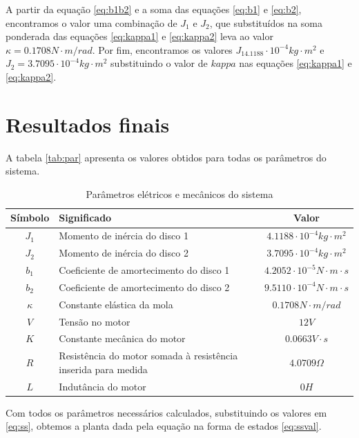 \documentclass{article}
\begin{document}
A partir da equação \ref{eq:b1b2} e a soma das equações \ref{eq:b1} e \ref{eq:b2}, encontramos o valor uma combinação de $J_1$ e $J_2$, que substituídos na soma ponderada das equações \ref{eq:kappa1} e \ref{eq:kappa2} leva ao valor $\kappa=0.1708N\cdot m/rad$. Por fim, encontramos os valores $J_14.1188\cdot10^{-4}kg\cdot m^2$ e $J_2=3.7095\cdot10^{-4}kg\cdot m^2$ substituindo o valor de $kappa$ nas equações \ref{eq:kappa1} e \ref{eq:kappa2}.

\section{Resultados finais}
A tabela \ref{tab:par} apresenta os valores obtidos para todas os parâmetros do sistema.
\begin{table}[H]
	\centering
	\caption{Parâmetros elétricos e mecânicos do sistema}
	\label{tab:valores}
	\begin{tabular}{|c|l|c|}
		\hline Símbolo & Significado & Valor \\ 
		\hline $J_1$ & Momento de inércia do disco 1 & $4.1188\cdot10^{-4}kg\cdot m^2$\\ 
		\hline $J_2$ & Momento de inércia do disco 2 & $3.7095\cdot10^{-4}kg\cdot m^2$\\
		\hline $b_1$ & Coeficiente de amortecimento do disco 1 & $4.2052\cdot10^{-5}N\cdot m\cdot s$\\
		\hline $b_2$ & Coeficiente de amortecimento do disco 2 & $9.5110\cdot10^{-4}N\cdot m\cdot s$\\ 	 
		\hline $\kappa$ & Constante elástica da mola & $0.1708N\cdot m/rad$\\ 
		\hline $V$ & Tensão no motor & $12V$\\ 
		\hline $K$ & Constante mecânica do motor & $0.0663 V \cdot s$\\ 
		\hline $R$ & Resistência do motor somada à resistência inserida para medida & $4.0709\Omega$ \\
		\hline $L$ & Indutância do motor & $0H$ \\ 	
		\hline 
	\end{tabular} 
\end{table}

Com todos os parâmetros necessários calculados, substituindo os valores em \ref{eq:ss}, obtemos a planta dada pela equação na forma de estados \ref{eq:ssval}.
\end{document}
